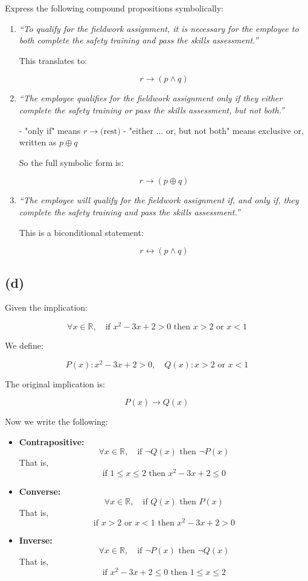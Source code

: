\documentclass{article}
\begin{document}
Express the following compound propositions symbolically:

\begin{enumerate}[label=\roman*.]

\item \textit{“To qualify for the fieldwork assignment, it is necessary for the employee to both complete the safety training and pass the skills assessment.”}

This translates to:

\[
r \to (p \land q)
\]

\item \textit{“The employee qualifies for the fieldwork assignment only if they either complete the safety training or pass the skills assessment, but not both.”}

- "only if" means \( r \to \text{(rest)} \)
- "either ... or, but not both" means exclusive or, written as \( p \oplus q \)

So the full symbolic form is:

\[
r \to (p \oplus q)
\]

\item \textit{“The employee will qualify for the fieldwork assignment if, and only if, they complete the safety training and pass the skills assessment.”}

This is a biconditional statement:

\[
r \leftrightarrow (p \land q)
\]

\end{enumerate}

\subsection*{(d)}

Given the implication:

\[
\forall x \in \mathbb{R}, \quad \text{if } x^2 - 3x + 2 > 0 \text{ then } x > 2 \text{ or } x < 1
\]

We define:

\[
P(x): x^2 - 3x + 2 > 0, \quad Q(x): x > 2 \text{ or } x < 1
\]

The original implication is:

\[
P(x) \to Q(x)
\]

Now we write the following:

\begin{itemize}

\item \textbf{Contrapositive:}
\[
\forall x \in \mathbb{R}, \quad \text{if } \neg Q(x) \text{ then } \neg P(x)
\]
That is,
\[
\text{if } 1 \leq x \leq 2 \text{ then } x^2 - 3x + 2 \leq 0
\]

\item \textbf{Converse:}
\[
\forall x \in \mathbb{R}, \quad \text{if } Q(x) \text{ then } P(x)
\]
That is,
\[
\text{if } x > 2 \text{ or } x < 1 \text{ then } x^2 - 3x + 2 > 0
\]

\item \textbf{Inverse:}
\[
\forall x \in \mathbb{R}, \quad \text{if } \neg P(x) \text{ then } \neg Q(x)
\]
That is,
\[
\text{if } x^2 - 3x + 2 \leq 0 \text{ then } 1 \leq x \leq 2
\]

\end{itemize}
\end{document}

